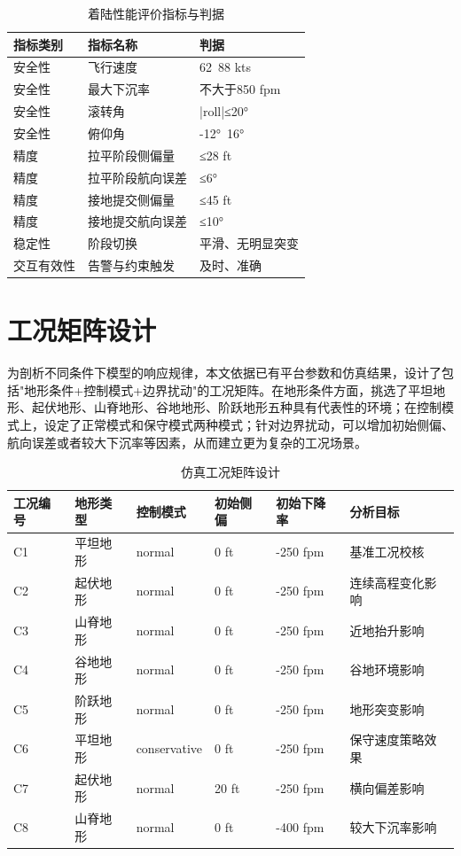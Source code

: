\begin{table}[H]
\centering
\caption{着陆性能评价指标与判据}
\begin{tabular}{|l|l|l|}
\hline
\textbf{指标类别} & \textbf{指标名称} & \textbf{判据} \\
\hline
安全性 & 飞行速度 & 62~88 kts \\
\hline
安全性 & 最大下沉率 & 不大于850 fpm \\
\hline
安全性 & 滚转角 & |roll|≤20° \\
\hline
安全性 & 俯仰角 & -12°~16° \\
\hline
精度 & 拉平阶段侧偏量 & ≤28 ft \\
\hline
精度 & 拉平阶段航向误差 & ≤6° \\
\hline
精度 & 接地提交侧偏量 & ≤45 ft \\
\hline
精度 & 接地提交航向误差 & ≤10° \\
\hline
稳定性 & 阶段切换 & 平滑、无明显突变 \\
\hline
交互有效性 & 告警与约束触发 & 及时、准确 \\
\hline
\end{tabular}
\end{table}

\section{工况矩阵设计}

为剖析不同条件下模型的响应规律，本文依据已有平台参数和仿真结果，设计了包括"地形条件+控制模式+边界扰动"的工况矩阵。在地形条件方面，挑选了平坦地形、起伏地形、山脊地形、谷地地形、阶跃地形五种具有代表性的环境；在控制模式上，设定了正常模式和保守模式两种模式；针对边界扰动，可以增加初始侧偏、航向误差或者较大下沉率等因素，从而建立更为复杂的工况场景。

\begin{table}[H]
\centering
\caption{仿真工况矩阵设计}
\begin{tabular}{|l|l|l|l|l|l|}
\hline
\textbf{工况编号} & \textbf{地形类型} & \textbf{控制模式} & \textbf{初始侧偏} & \textbf{初始下降率} & \textbf{分析目标} \\
\hline
C1 & 平坦地形 & normal & 0 ft & -250 fpm & 基准工况校核 \\
\hline
C2 & 起伏地形 & normal & 0 ft & -250 fpm & 连续高程变化影响 \\
\hline
C3 & 山脊地形 & normal & 0 ft & -250 fpm & 近地抬升影响 \\
\hline
C4 & 谷地地形 & normal & 0 ft & -250 fpm & 谷地环境影响 \\
\hline
C5 & 阶跃地形 & normal & 0 ft & -250 fpm & 地形突变影响 \\
\hline
C6 & 平坦地形 & conservative & 0 ft & -250 fpm & 保守速度策略效果 \\
\hline
C7 & 起伏地形 & normal & 20 ft & -250 fpm & 横向偏差影响 \\
\hline
C8 & 山脊地形 & normal & 0 ft & -400 fpm & 较大下沉率影响 \\
\hline
\end{tabular}
\end{table}


